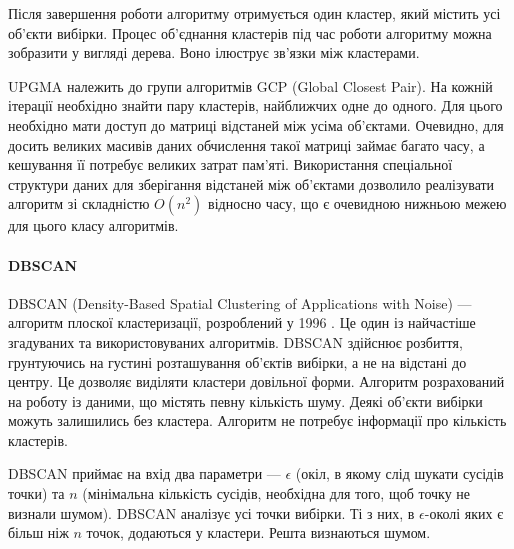             Після завершення роботи алгоритму отримується один кластер, який містить усі об'єкти вибірки. Процес об'єднання кластерів під час роботи алгоритму можна зобразити у вигляді дерева. Воно ілюструє зв'язки між кластерами.
            
            UPGMA належить до групи алгоритмів GCP (Global Closest Pair). На кожній ітерації необхідно знайти пару кластерів, найближчих одне до одного. Для цього необхідно мати доступ до матриці відстаней між усіма об'єктами. Очевидно, для досить великих масивів даних обчислення такої матриці займає багато часу, а кешування її потребує великих затрат пам'яті. Використання спеціальної структури даних для зберігання відстаней між об'єктами дозволило реалізувати алгоритм зі складністю $O(n^2)$ \cite{Eppstein} відносно часу, що є очевидною нижньою межею для цього класу алгоритмів.
            
        \paragraph {DBSCAN}
        
            DBSCAN (Density-Based Spatial Clustering of Applications with Noise) --- алгоритм плоскої кластеризації, розроблений у 1996 \cite{DBSCAN}. Це один із найчастіше згадуваних та використовуваних алгоритмів. DBSCAN здійснює розбиття, грунтуючись на густині розташування об'єктів вибірки, а не на відстані до центру. Це дозволяє виділяти кластери довільної форми. Алгоритм розрахований на роботу із даними, що містять певну кількість шуму. Деякі об'єкти вибірки можуть залишились без кластера. Алгоритм не потребує інформації про кількість кластерів.
            
            DBSCAN приймає на вхід два параметри --- $\epsilon$ (окіл, в якому слід шукати сусідів точки) та $n$ (мінімальна кількість сусідів, необхідна для того, щоб точку не визнали шумом). DBSCAN аналізує усі точки вибірки. Ті з них, в $\epsilon$-околі яких є більш ніж $n$ точок, додаються у кластери. Решта визнаються шумом.
            
